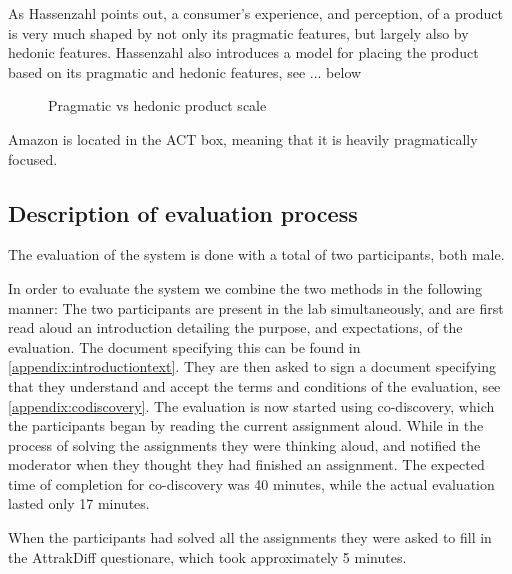 As Hassenzahl  points out, a consumer's experience, and perception, of a product is very much shaped by not only its pragmatic features, but largely also  by hedonic features. Hassenzahl also introduces a model for placing the product based on its pragmatic and hedonic features, see ... below
\begin{figure}[h]

\caption{Pragmatic vs hedonic product scale}
\end{figure}

Amazon is located in the ACT box, meaning that it is heavily pragmatically focused. 

\subsection{Description of evaluation process}
The evaluation of the system is done with a total of two participants, both male.

In order to evaluate the system we combine the two methods in the following manner: The two participants are present in the lab simultaneously, and are first read aloud an introduction detailing the purpose, and expectations, of the evaluation. The document specifying this can be found in \autoref{appendix:introductiontext}. They are then asked to sign a document specifying that they understand and accept the terms and conditions of the evaluation, see \autoref{appendix:codiscovery}.
The evaluation is now started using co-discovery, which the participants began by reading the current assignment aloud. While in the process of solving the assignments they were thinking aloud, and notified the moderator when they thought they had finished an assignment. The expected time of completion for co-discovery was 40 minutes, while the actual evaluation lasted only 17 minutes.

When the participants had solved all the assignments they were asked to fill in the AttrakDiff questionare, which took approximately 5 minutes.

